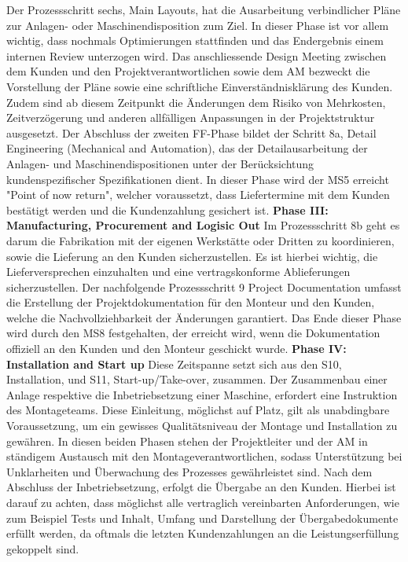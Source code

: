 \documentclass[11pt]{article}
\begin{document}
Der Prozessschritt sechs, Main Layouts, hat die Ausarbeitung verbindlicher Pläne zur Anlagen- oder Maschinendisposition zum Ziel. In dieser Phase ist vor allem wichtig, dass nochmals Optimierungen stattfinden und das Endergebnis einem internen Review unterzogen wird. Das anschliessende Design Meeting zwischen dem Kunden und den Projektverantwortlichen sowie dem AM bezweckt die Vorstellung der Pläne sowie eine schriftliche Einverständnisklärung des Kunden. Zudem sind ab diesem Zeitpunkt die Änderungen dem Risiko von Mehrkosten, Zeitverzögerung und anderen allfälligen Anpassungen in der Projektstruktur ausgesetzt. Der Abschluss der zweiten FF-Phase bildet der Schritt 8a, Detail Engineering (Mechanical and Automation), das der Detailausarbeitung der Anlagen- und Maschinendispositionen unter der Berücksichtung kundenspezifischer Spezifikationen dient. In dieser Phase wird der MS5 erreicht "Point of now return", welcher voraussetzt, dass Liefertermine mit dem Kunden bestätigt werden und die Kundenzahlung gesichert ist. 
\newline
\textbf{Phase III: Manufacturing, Procurement and Logisic Out}
\newline
Im Prozessschritt 8b geht es darum die Fabrikation mit der eigenen Werkstätte oder Dritten zu koordinieren, sowie die Lieferung an den Kunden sicherzustellen. Es ist hierbei wichtig, die Lieferversprechen einzuhalten und eine vertragskonforme Ablieferungen sicherzustellen. Der nachfolgende Prozessschritt 9 Project Documentation umfasst die Erstellung der Projektdokumentation für den Monteur und den Kunden, welche die Nachvollziehbarkeit der Änderungen garantiert. Das Ende dieser Phase wird durch den MS8 festgehalten, der erreicht wird, wenn die Dokumentation offiziell an den Kunden und den Monteur geschickt wurde. 
\newline
\textbf{Phase IV: Installation and Start up}
\newline
Diese Zeitspanne setzt sich aus den S10, Installation, und S11, Start-up/Take-over, zusammen. Der Zusammenbau einer Anlage respektive die Inbetriebsetzung einer Maschine, erfordert eine Instruktion des Montageteams. Diese Einleitung, möglichst auf Platz, gilt als unabdingbare Voraussetzung, um ein gewisses Qualitätsniveau der Montage und Installation zu gewähren. In diesen beiden Phasen stehen der Projektleiter und der AM in ständigem Austausch mit den Montageverantwortlichen, sodass Unterstützung bei Unklarheiten und Überwachung des Prozesses gewährleistet sind. Nach dem Abschluss der Inbetriebsetzung, erfolgt die Übergabe an den Kunden. Hierbei ist darauf zu achten, dass möglichst alle vertraglich vereinbarten Anforderungen, wie zum Beispiel Tests und Inhalt, Umfang und Darstellung der Übergabedokumente erfüllt werden, da oftmals die letzten Kundenzahlungen an die Leistungserfüllung gekoppelt sind. 
\end{document}
